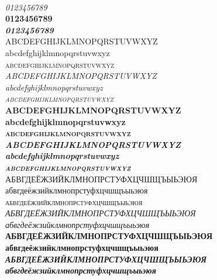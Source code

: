 \documentclass[10pt, twoside]{lecturenotes}
\begin{document}

\begin{sloppypar}
\begin{figure}[ht]
{\Huge{}}
{\Huge{}}

{
\begin{minipage}[b]{0.45\linewidth}
\\
\textit{0123456789}\\
\textbf{0123456789}\\
\textbf{\textit{0123456789}}\\

\noindent
ABCDEFGHIJKLMNOPQRSTUVWXYZ\\
abcdefghijklmnopqrstuvwxyz\\
\textsc{abcdefghijklmnopqrstuvwxyz}\\
\textit{ABCDEFGHIJKLMNOPQRSTUVWXYZ\\
abcdefghijklmnopqrstuvwxyz\\
\textsc{abcdefghijklmnopqrstuvwxyz}}\\
\textbf{ABCDEFGHIJKLMNOPQRSTUVWXYZ\\
abcdefghijklmnopqrstuvwxyz\\
\textsc{abcdefghijklmnopqrstuvwxyz}}\\
\textbf{\textit{ABCDEFGHIJKLMNOPQRSTUVWXYZ\\
abcdefghijklmnopqrstuvwxyz\\
\textsc{abcdefghijklmnopqrstuvwxyz}}}\\

\noindent
АБВГДЕЁЖЗИЙКЛМНОПРСТУФХЦЧШЩЪЫЬЭЮЯ \\
абвгдеёжзийклмнопрстуфхцчшщъыьэюя \\
\textsc{абвгдеёжзийклмнопрстуфхцчшщъыьэюя}\\
\textit{АБВГДЕЁЖЗИЙКЛМНОПРСТУФХЦЧШЩЪЫЬЭЮЯ\\
абвгдеёжзийклмнопрстуфхцчшщъыьэюя }\\
\textbf{АБВГДЕЁЖЗИЙКЛМНОПРСТУФХЦЧШЩЪЫЬЭЮЯ \\
абвгдеёжзийклмнопрстуфхцчшщъыьэюя }\\
\textbf{\textit{АБВГДЕЁЖЗИЙКЛМНОПРСТУФХЦЧШЩЪЫЬЭЮЯ \\
абвгдеёжзийклмнопрстуфхцчшщъыьэюя }}\\



\end{minipage}}
\end{figure}
\end{sloppypar}
\end{document}
